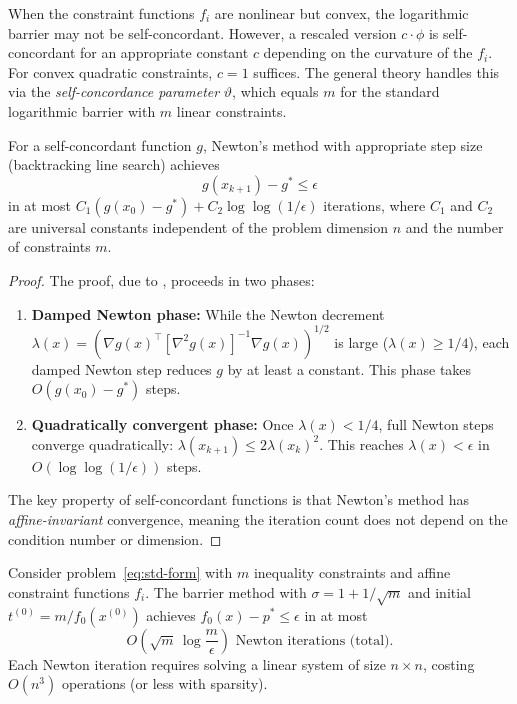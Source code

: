 \documentclass[11pt,a4paper]{article}
\begin{document}
\begin{remark}%
\label{rem:sc-general}
When the constraint functions $f_i$ are nonlinear but convex, the
logarithmic barrier may not be self-concordant. However, a rescaled
version $c \cdot \phi$ is self-concordant for an appropriate constant
$c$ depending on the curvature of the $f_i$. For convex quadratic
constraints, $c = 1$ suffices. The general theory handles this via
the \emph{self-concordance parameter} $\vartheta$, which equals $m$
for the standard logarithmic barrier with $m$ linear constraints.
\end{remark}

\begin{theorem}%
\label{thm:newton-sc}
For a self-concordant function $g$, Newton's method with appropriate
step size (backtracking line search) achieves
\begin{equation}\label{eq:newton-sc}
  g(x_{k+1}) - g^* \le \epsilon
\end{equation}
in at most $C_1 (g(x_0) - g^*) + C_2 \log\log(1/\epsilon)$ iterations,
where $C_1$ and $C_2$ are universal constants independent of the
problem dimension $n$ and the number of constraints $m$.
\end{theorem}

\begin{proof}
The proof, due to \citet{nesterov2004}, proceeds in two phases:
\begin{enumerate}[label=(\roman*)]
  \item \textbf{Damped Newton phase:} While the Newton decrement
    $\lambda(x) = (\nabla g(x)^\top [\nabla^2 g(x)]^{-1}
    \nabla g(x))^{1/2}$ is large ($\lambda(x) \ge 1/4$), each
    damped Newton step reduces $g$ by at least a constant. This
    phase takes $O(g(x_0) - g^*)$ steps.
  \item \textbf{Quadratically convergent phase:} Once
    $\lambda(x) < 1/4$, full Newton steps converge quadratically:
    $\lambda(x_{k+1}) \le 2\lambda(x_k)^2$. This reaches
    $\lambda(x) < \epsilon$ in $O(\log\log(1/\epsilon))$ steps.
\end{enumerate}
The key property of self-concordant functions is that Newton's method
has \emph{affine-invariant} convergence, meaning the iteration count
does not depend on the condition number or dimension.
\end{proof}

\begin{theorem}%
\label{thm:barrier-complexity}
Consider problem~\eqref{eq:std-form} with $m$ inequality constraints
and affine constraint functions $f_i$. The barrier method with
$\sigma = 1 + 1/\sqrt{m}$ and initial $t^{(0)} = m/f_0(x^{(0)})$
achieves $f_0(x) - p^* \le \epsilon$ in at most
\begin{equation}\label{eq:total-complexity}
  \boxed{O\!\left(\sqrt{m}\,\log\frac{m}{\epsilon}\right)
  \text{ Newton iterations (total).}}
\end{equation}
Each Newton iteration requires solving a linear system of size
$n \times n$, costing $O(n^3)$ operations (or less with sparsity).
\end{theorem}
\end{document}
